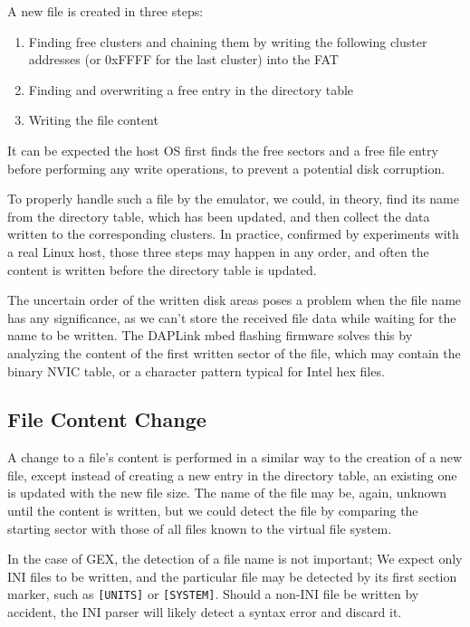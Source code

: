 A new file is created in three steps:

\begin{enumerate}
	\item Finding free clusters and chaining them by writing the following cluster addresses (or 0xFFFF for the last cluster) into the \gls{FAT}
	\item Finding and overwriting a free entry in the directory table
	\item Writing the file content
\end{enumerate}

It can be expected the host \gls{OS} first finds the free sectors and a free file entry before performing any write operations, to prevent a potential disk corruption.

To properly handle such a file by the emulator, we could, in theory, find its name from the directory table, which has been updated, and then collect the data written to the corresponding clusters. In practice, confirmed by experiments with a real Linux host, those three steps may happen in any order, and often the content is written before the directory table is updated. 

The uncertain order of the written disk areas poses a problem when the file name has any significance, as we can't store the received file data while waiting for the name to be written. The DAPLink mbed flashing firmware solves this by analyzing the content of the first written sector of the file, which may contain the binary \gls{NVIC} table, or a character pattern typical for Intel hex files.

\subsection{File Content Change}

A change to a file's content is performed in a similar way to the creation of a new file, except instead of creating a new entry in the directory table, an existing one is updated with the new file size. The name of the file may be, again, unknown until the content is written, but we could detect the file by comparing the starting sector with those of all files known to the virtual file system.

In the case of GEX, the detection of a file name is not important; We expect only INI files to be written, and the particular file may be detected by its first section marker, such as \verb|[UNITS]| or \verb|[SYSTEM]|. Should a non-INI file be written by accident, the INI parser will likely detect a syntax error and discard it.

